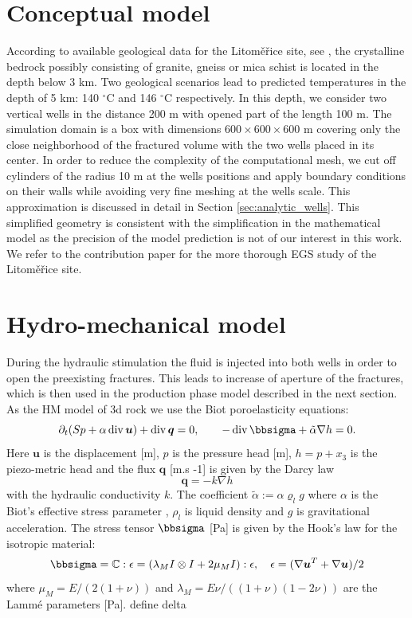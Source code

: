 \documentclass{article}
\newcommand{\CC}{\mathbb C}
\renewcommand{\div}{\operatorname{div}}
\newcommand{\eq}[1]{\begin{equation}#1\end{equation}}
\newcommand{\uu}{\vc u}
\newcommand{\vc}[1]{\boldsymbol{#1}}
\newcommand{\todo}[1]{{\color{red}#1}}
\newcommand{\degC}{$^\circ\mathrm{C}$}
\begin{document}
\section{Conceptual model}
According to available geological data for the Litom{\v e}{\v r}ice site, see \cite{Capova2013}, the crystalline bedrock possibly consisting of granite, gneiss or mica schist is located in the depth below 3 km.
Two geological scenarios lead to predicted temperatures in the depth of 5 km: 140 \degC{} and 146 \degC{} respectively. In this depth, we consider two vertical wells in the distance 200 m with opened part of the length 100 m. The simulation domain is a box with dimensions $600\times600\times600$ m covering only the close neighborhood of the fractured volume with the two wells placed in its center. In order to reduce the complexity of the computational mesh, we cut off cylinders of the radius 10 m at the wells positions and apply boundary conditions on their walls while avoiding very fine meshing at the wells scale. This approximation is discussed in detail in Section \ref{sec:analytic_wells}. This simplified geometry is consistent with the simplification in the mathematical model as the precision of the model prediction is not of our interest in this work. We refer to the contribution paper \cite{Ralek} for the more thorough EGS study of the Litom{\v e}{\v r}ice site.


\section{Hydro-mechanical model}
\label{sc:hm_model}
During the hydraulic stimulation the fluid is injected into both wells in order to open the preexisting fractures. This leads to increase of aperture of the fractures, which is then used in the production phase model described in the next section. As the HM model of 3d rock we use the Biot poroelasticity equations:
\eq{\label{eq:biot} \partial_t(Sp + \alpha\div\uu) +\div\vc q = 0,\qquad -\div\bbsigma + \tilde\alpha\nabla h = 0. }
Here $\uu$ is the displacement [m], $p$ is the pressure head [m], $h=p+x_3$ is the piezo-metric head and the flux $\vc q$ [m.s -1] is given by the Darcy law
\eq{ \vc q = - k\nabla h}
with the hydraulic conductivity $k$. The coefficient $\tilde\alpha:=\alpha\varrho_l g$ where $\alpha$ is the Biot's effective stress parameter \cite{Biot1941},
$\rho_l$ is liquid density and $g$ is gravitational acceleration.
The stress tensor $\bbsigma$ [Pa] is given by the Hook's law
for the isotropic material:
\eq{ \bbsigma = \CC : \epsilon 
= (\lambda_M I\otimes I +2\mu_M I):\epsilon, \quad \epsilon = (\nabla \uu^T + \nabla \uu)/2}
where $\mu_M=E/(2(1+\nu))$ and $\lambda_M=E\nu/((1+\nu)(1-2\nu))$
are the Lammé parameters [Pa].
\todo{define delta}
\end{document}

